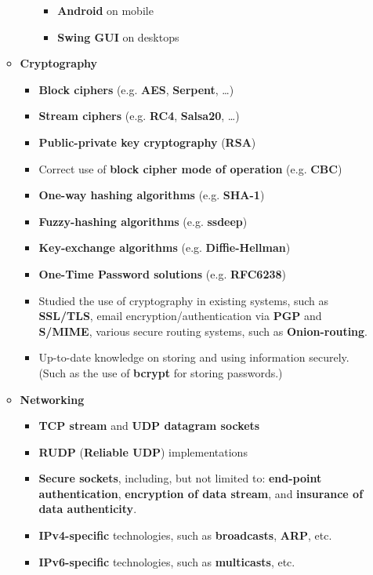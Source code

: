 \documentclass[12pt,a4paper]{article}
\begin{document}
\begin{itemize}
\begin{itemize}
\begin{itemize}
				\begin{itemize}
				\item	\textbf{Android} on mobile
				\item	\textbf{Swing GUI} on desktops
				\end{itemize}
			\end{itemize}
		\item	\textbf{Cryptography}
			\begin{itemize}
			\item	\textbf{Block ciphers} (e.g. \textbf{AES}, \textbf{Serpent}, \ldots)
			\item	\textbf{Stream ciphers} (e.g. \textbf{RC4}, \textbf{Salsa20}, \ldots)
			\item	\textbf{Public-private key cryptography} (\textbf{RSA})
			\item	Correct use of \textbf{block cipher mode of operation} (e.g. \textbf{CBC})
			\item	\textbf{One-way hashing algorithms} (e.g. \textbf{SHA-1})
			\item	\textbf{Fuzzy-hashing algorithms} (e.g. \textbf{ssdeep})
			\item	\textbf{Key-exchange algorithms} (e.g. \textbf{Diffie-Hellman})
			\item	\textbf{One-Time Password solutions} (e.g. \textbf{RFC6238})
			\item	Studied the use of cryptography in existing systems, such as \textbf{SSL/TLS}, email encryption/authentication via \textbf{PGP} and \textbf{S/MIME}, various secure routing systems, such as \textbf{Onion-routing}.
			\item	Up-to-date knowledge on storing and using information securely. (Such as the use of \textbf{bcrypt} for storing passwords.)
			\end{itemize}
		\item	\textbf{Networking}
			\begin{itemize}
			\item	\textbf{TCP stream} and \textbf{UDP datagram sockets}
			\item	\textbf{RUDP} (\textbf{Reliable UDP}) implementations
			\item	\textbf{Secure sockets}, including, but not limited to: \textbf{end-point authentication}, \textbf{encryption of data stream}, and \textbf{insurance of data authenticity}.
			\item	\textbf{IPv4-specific} technologies, such as \textbf{broadcasts}, \textbf{ARP}, etc.
			\item	\textbf{IPv6-specific} technologies, such as \textbf{multicasts}, etc.

\end{itemize}
\end{itemize}
\end{itemize}
\end{document}
